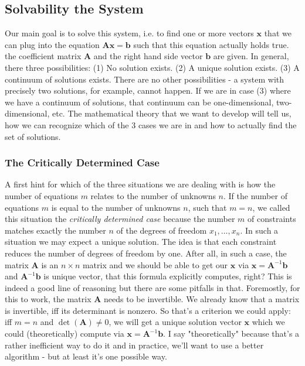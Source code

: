 
\subsection{Solvability the System}
Our main goal is to solve this system, i.e. to find one or more vectors $\mathbf{x}$ that we can plug into the equation $\mathbf{A x} = \mathbf{b}$ such that this equation actually holds true. the coefficient matrix $\mathbf{A}$ and the right hand side vector $\mathbf{b}$ are given. In general, there three possibilities: (1) No solution exists. (2) A unique solution exists. (3) A continuum of solutions exists. There are no other possibilities - a system with precisely two solutions, for example, cannot happen. If we are in case (3) where we have a continuum of solutions, that continuum can be one-dimensional, two-dimensional, etc. The mathematical theory that we want to develop will tell us, how we can recognize which of the 3 cases we are in and how to actually find the set of solutions.

\subsubsection{The Critically Determined Case}
A first hint for which of the three situations we are dealing with is how the number of equations $m$ relates to the number of unknowns $n$. If the number of equations $m$ is equal to the number of unknowns $n$, such that $m=n$, we called this situation the \emph{critically determined case} because the number $m$ of constraints matches exactly the number $n$ of the degrees of freedom $x_1, \ldots, x_n$. In such a situation we may expect a unique solution. The idea is that each constraint reduces the number of degrees of freedom by one. After all, in such a case, the matrix $\mathbf{A}$ is an $n \times n$ matrix and we should be able to get our $\mathbf{x}$ via $\mathbf{x} = \mathbf{A}^{-1} \mathbf{b}$ and $\mathbf{A}^{-1} \mathbf{b}$ is unique vector, that this formula explicitly computes, right? This is indeed a good line of reasoning but there are some pitfalls in that. Foremostly, for this to work, the matrix $\mathbf{A}$ needs to be invertible. We already know that a matrix is invertible, iff its determinant is nonzero. So that's a criterion we could apply: iff $m = n$ and $\det(\mathbf{A}) \neq 0$, we will get a unique solution vector $\mathbf{x}$ which we could (theoretically) compute via $\mathbf{x} = \mathbf{A}^{-1} \mathbf{b}$. I say "theoretically" because that's a rather inefficient way to do it and in practice, we'll want to use a better algorithm - but at least it's one possible way.

